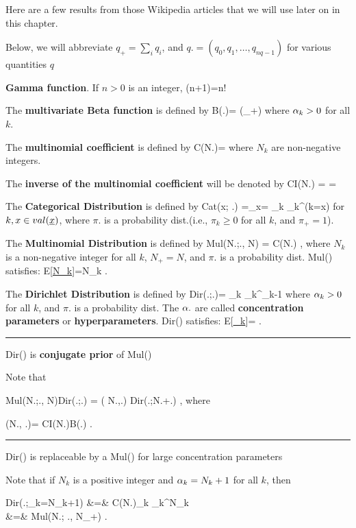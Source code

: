 Here are a few 
results 
from those Wikipedia
articles that we
will use later on
in this chapter.

Below,
we will abbreviate
$q_+=\sum_i q_i$, and
$q.=(q_0, q_1, \ldots, q_{nq-1})$
for various quantities $q$

{\bf Gamma function}. If $n>0$ is an integer,
\beq
\Gamma(n+1)=n!
\eeq

The {\bf multivariate Beta function} 
is defined by
\beq
B(\alp.)=
{\Gamma(\alp_+)}
\eeq
where $\alpha_k>0$ for all $k$.

The {\bf multinomial coefficient}
is defined by
\beq
C(N.)=
\eeq
where $N_k$ are non-negative
integers.

The {\bf inverse of the multinomial 
coefficient} will
be denoted by
\beq
CI(N.)
=
=
\eeq

The {\bf Categorical Distribution}
is defined by
\beq
Cat(x; \pi.)
=\pi_x=
\prod_{k} \pi_k^{\indi(k=x)}
\eeq
for $k, x\in val(\rvx)$,
where 
$\pi.$ is a
probability dist.(i.e., $\pi_k\geq 0$
for all $k$,
and $\pi_+=1$).



The {\bf Multinomial Distribution}
is defined by
\beq
Mul(N.;\pi., N)
=
C(N.)
\;,
\eeq
where $N_k$
is a non-negative
integer for all $k$,
$N_+=N$,
and $\pi.$
is a probability dist.
Mul() satisfies:
\beq
E[\ul{N_k}]=N\pi_k
\;.
\label{eq-exp-val-mul}
\eeq

The {\bf Dirichlet Distribution}
is defined by
\beq
Dir(\pi.;\alp.)=
\prod_k
\pi_k^{\alp_k-1}
\eeq
where $\alpha_k>0$
for all $k$,
and $\pi.$
is a probability dist.
The
$\alpha.$ are called 
{\bf concentration parameters}
or {\bf hyperparameters}.
Dir() satisfies:
\beq
E[\ul{\pi_k}]=
\;.
\label{eq-exp-val-dir}
\eeq


\hrule\noindent
Dir() is {\bf conjugate prior} of  Mul()

Note that

\beq
Mul(N.;\pi., N)Dir(\pi.;\alp.)
=
\calk( N.,\alp.)
Dir(\pi.;N.+\alp.)
\;,
\eeq
where

\beq
\calk(N., \alp.)=
{CI(N.)B(\alp.)}
\;.
\eeq
\hrule\noindent
Dir() is replaceable by a Mul()
for large concentration parameters

Note that if $N_k$ is a positive  integer
and
$\alpha_k=N_k+1$ for all $k$, then

\beqa 
Dir(\pi.;\alp_k=N_k+1)
&=&
C(N.)\prod_k \pi_k^{N_k}
\\
&=&
Mul(N.; \pi., N_+)
\;.
\eeqa

